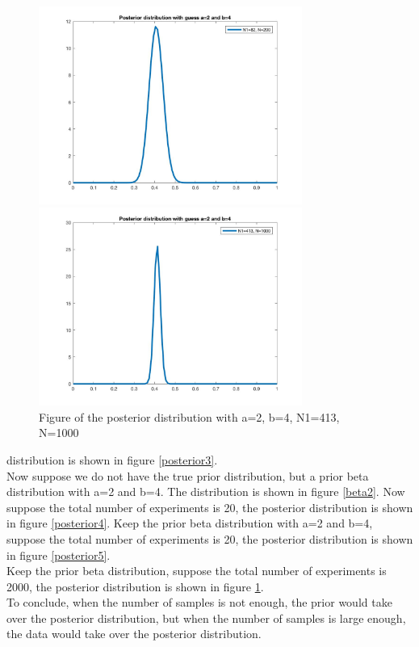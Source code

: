 \documentclass[a4paper]{article}
\begin{document}
\begin{spacing}{2.0}
\begin{enumerate}[(1)]
\begin{figure}[htbp]
\begin{minipage}[t]{0.5\linewidth}
\centering
\includegraphics[width=3.4in]{posterior5.jpg}
\caption{Figure of the beta distribution with a=2, b=4, N1=82, N=200}
\label{posterior5}
\end{minipage}
\begin{minipage}[t]{0.5\linewidth}
\centering
\includegraphics[width=3.4in]{posterior6.jpg}
\caption{Figure of the posterior distribution with a=2, b=4, N1=413, N=1000}
\label{posterior6}
\end{minipage}
\end{figure}


distribution is shown in figure \ref{posterior3}.\\
Now suppose we do not have the true prior distribution, but a prior beta distribution with a=2 and b=4. The distribution is shown in figure \ref{beta2}. Now suppose the total number of experiments is 20, the posterior distribution is shown in figure \ref{posterior4}.
Keep the prior beta distribution with a=2 and b=4, suppose the total number of experiments is 20, the posterior distribution is shown in figure \ref{posterior5}.\\
Keep the prior beta distribution, suppose the total  number of experiments is 2000, the posterior distribution is shown in figure \ref{posterior6}.\\
To conclude, when the number of samples is not enough, the prior would take over the posterior distribution,  but when the number of samples is large enough, the data would take over the posterior distribution.


\end{enumerate}


	
\end{spacing}
\end{document}
